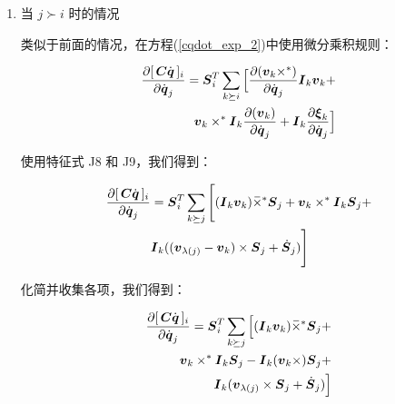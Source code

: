 \documentclass[letterpaper, 10 pt, conference]{ieeetran}  %
\begin{document}
{\begin{enumerate}
对索引 $k$ 求和，我们得到：

  \begin{equation}
      \begin{aligned}
        \frac{\partial  [\,\C \qd\,]_{i}}{\partial \qd_{j}} =   \Phibar_{i}^{T} \Big[2 \B_{i}^{C} \Phibar_{j} +  \I_{i}^{C} (\Psibardot_{j} + \Phibardot_{j} ) \Big]  
        \label{partial_Cqdot_dot_4}
      \end{aligned}
\end{equation}

\item 当 $j \succ i$ 时的情况

  类似于前面的情况，在方程(\ref{cqdot_exp_2})中使用微分乘积规则：
  
  \begin{equation}
      \begin{aligned}
        \frac{\partial  [\,\C \qd\,]_{i}}{\partial \qd_{j}} =   \Phibar_{i}^{T}  \sum_{k \succeq i} \Big[\frac{\partial (\v_{k} \times^*)}{\partial \qd_{j}} \I_{k} \v_{k} + \\
         \v_{k} \times^* \I_{k} \frac{ \partial (\v_{k})}{\partial \qd_{j}} +  \I_{k} \frac{\partial \xibar_{k} }{\partial \qd_{j}} \Big]  
        \label{partial_Cqdot_dot_5}
      \end{aligned}
\end{equation}

使用特征式 J8 和 J9，我们得到：

  \begin{equation}
       \begin{aligned}
        \frac{\partial  [\,\C \qd\,]_{i}}{\partial \qd_{j}} &=   \Phibar_{i}^{T}  \sum_{k \succeq j} \Bigg[(\I_{k} \v_{k}) \crff \Phibar_{j}  + \v_{k} \times^* \I_{k} \Phibar_{j} + \\&
         \I_{k} ((\v_{\lambda(j)} - \v_{k})  \times \Phibar_{j} + 
        \Phibardot_{j} ) \Bigg]  
        \label{partial_Cqdot_dot_6}
      \end{aligned}
\end{equation}


化简并收集各项，我们得到：

   \begin{equation}
      \begin{aligned}
        \frac{\partial  [\,\C \qd\,]_{i}}{\partial \qd_{j}} =   \Phibar_{i}^{T}  \sum_{k \succeq j} \Big[(\I_{k} \v_{k}) \crff \Phibar_{j}  + \\
        \v_{k} \times^* \I_{k} \Phibar_{j}  -\I_{k}(\v_{k} \times) \Phibar_{j} + \\
        \I_{k} (\v_{\lambda(j)}  \times \Phibar_{j} + \Phibardot_{j} ) \Big] 
        \label{partial_Cqdot_dot_7}
      \end{aligned}
\end{equation}


\end{enumerate}}
\end{document}
